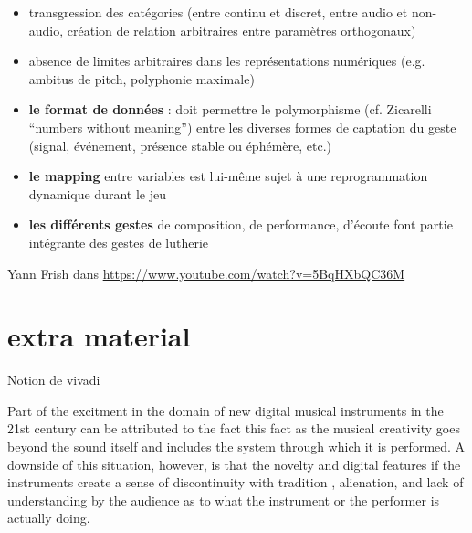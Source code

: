 \vspace{-1em}
\begin{itemize}[noitemsep]
\item transgression des catégories (entre continu et discret, entre audio et non-audio, création de relation arbitraires entre paramètres orthogonaux)
\item absence de limites arbitraires dans les représentations numériques (e.g. ambitus de pitch, polyphonie maximale)
\end{itemize}

\vspace{-1em}
\begin{itemize}[noitemsep]
\item \textbf{le format de données} : doit permettre le polymorphisme (cf. Zicarelli ``numbers without meaning'') entre les diverses formes de captation du geste (signal, événement, présence stable ou éphémère, etc.)
\item \textbf{le mapping} entre variables est lui-même sujet à une reprogrammation dynamique durant le jeu
\item \textbf{les différents gestes} de composition, de performance, d'écoute font partie intégrante des gestes de lutherie
\end{itemize}




 Yann Frish dans \url{https://www.youtube.com/watch?v=5BqHXbQC36M}




\section*{extra material}
Notion de vivadi

Part of the excitment in the domain of new digital musical instruments in the 21st century can be attributed to the fact this fact as the musical creativity goes beyond the sound itself and includes the system through which it is performed. A downside of this situation, however, is that the novelty and digital features if the instruments create a sense of discontinuity with tradition , alienation, and lack of understanding by the audience as to what the instrument or the performer is actually doing.
\cite{magnusson_sonic_2019}



